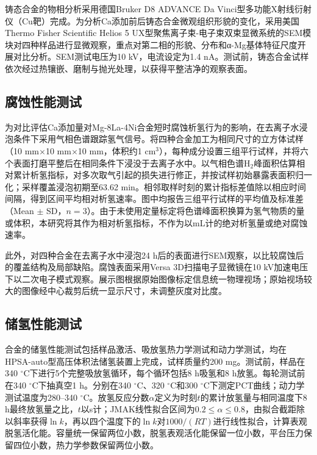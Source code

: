 \documentclass[preprint,12pt]{elsarticle}
\begin{document}
铸态合金的物相分析采用德国Bruker D8 ADVANCE Da Vinci型多功能X射线衍射仪（Cu靶）完成。为分析Ca添加前后铸态合金微观组织形貌的变化，采用美国Thermo Fisher Scientific Helios 5 UX型聚焦离子束-电子束双束显微系统的SEM模块对四种样品进行显微观察，重点对第二相的形貌、分布和α-Mg基体特征尺度开展对比分析。SEM测试电压为10 kV，电流设定为1.4 nA。测试前，铸态合金试样依次经过热镶嵌、磨制与抛光处理，以获得平整洁净的观察表面。

\subsection{腐蚀性能测试}

为对比评估Ca添加量对Mg-8La-4Ni合金短时腐蚀析氢行为的影响，在去离子水浸泡条件下采用气相色谱跟踪氢气信号。将四种合金加工为相同尺寸的立方体试样（10 mm$\times$10 mm$\times$10 mm，体积约1 cm$^{3}$），每种成分设置三组平行试样，并将六个表面打磨平整后在相同条件下浸没于去离子水中。以气相色谱H$_2$峰面积估算相对累计析氢指标，对多次取气引起的损失进行修正，并按试样初始暴露表面积归一化；采样覆盖浸泡初期至63.62 min。相邻取样时刻的累计指标差值除以相应时间间隔，得到区间平均相对析氢速率。图中均报告三组平行试样的平均值及标准差（Mean $\pm$ SD，$n=3$）。由于未使用定量标定将色谱峰面积换算为氢气物质的量或体积，本研究将其作为相对析氢指标，不作为以mL计的绝对析氢量或绝对腐蚀速率。

此外，对四种合金在去离子水中浸泡24 h后的表面进行SEM观察，以比较腐蚀后的覆盖结构及局部缺陷。腐蚀表面采用Versa 3D扫描电子显微镜在10 kV加速电压下以二次电子模式观察。展示图根据原始图像标定信息统一物理视场；原始视场较大的图像经中心裁剪后统一显示尺寸，未调整灰度对比度。

\subsection{储氢性能测试}

合金的储氢性能测试包括样品激活、吸放氢热力学测试和动力学测试，均在HPSA-auto型高压体积法储氢装置上完成，试样质量约200 mg。测试前，样品在340 $^\circ$C下进行5个完整吸放氢循环，每个循环包括8 h吸氢和8 h放氢。每轮测试前在340 $^\circ$C下抽真空1 h。分别在340 $^\circ$C、320 $^\circ$C和300 $^\circ$C下测定PCT曲线；动力学测试温度为280–340 $^\circ$C。放氢反应分数$\alpha$定义为时刻$t$的累计放氢量与相同温度下8 h最终放氢量之比，$t$以s计；JMAK线性拟合区间为$0.2\leq\alpha\leq0.8$，由拟合截距除以斜率获得$\ln k$，再以四个温度下的$\ln k$对$1000/(RT)$进行线性拟合，计算表观脱氢活化能。容量统一保留两位小数，脱氢表观活化能保留一位小数，平台压力保留四位小数，热力学参数保留两位小数。
\end{document}

